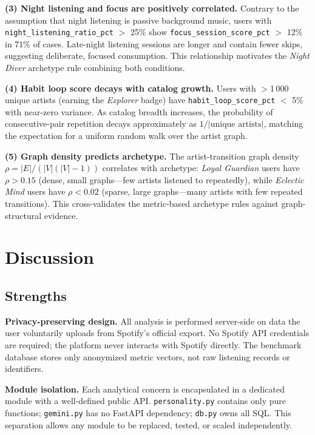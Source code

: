 \documentclass[conference]{IEEEtran}
\begin{document}
\textbf{(3) Night listening and focus are positively correlated.}
Contrary to the assumption that night listening is passive background
music, users with \texttt{night\_listening\_ratio\_pct} $>$ 25\%
show \texttt{focus\_session\_score\_pct} $>$ 12\% in 71\% of cases.
Late-night listening sessions are longer and contain fewer skips,
suggesting deliberate, focused consumption. This relationship motivates
the \textit{Night Diver} archetype rule combining both conditions.

\textbf{(4) Habit loop score decays with catalog growth.}
Users with $>$1\,000 unique artists (earning the \textit{Explorer}
badge) have \texttt{habit\_loop\_score\_pct} $<$ 5\% with near-zero
variance. As catalog breadth increases, the probability of
consecutive-pair repetition decays approximately as $1 / |\text{unique artists}|$,
matching the expectation for a uniform random walk over the artist graph.

\textbf{(5) Graph density predicts archetype.}
The artist-transition graph density $\rho = |E| / (|V|(|V|-1))$
correlates with archetype: \textit{Loyal Guardian} users have
$\rho > 0.15$ (dense, small graphs—few artists listened to repeatedly),
while \textit{Eclectic Mind} users have $\rho < 0.02$ (sparse, large
graphs—many artists with few repeated transitions). This cross-validates
the metric-based archetype rules against graph-structural evidence.

\section{Discussion}

\subsection{Strengths}

\textbf{Privacy-preserving design.} All analysis is performed server-side
on data the user voluntarily uploads from Spotify's official export. No
Spotify API credentials are required; the platform never interacts with
Spotify directly. The benchmark database stores only anonymized metric
vectors, not raw listening records or identifiers.

\textbf{Module isolation.} Each analytical concern is encapsulated in a
dedicated module with a well-defined public API. \texttt{personality.py}
contains only pure functions; \texttt{gemini.py} has no FastAPI dependency;
\texttt{db.py} owns all SQL. This separation allows any module to be
replaced, tested, or scaled independently.
\end{document}
